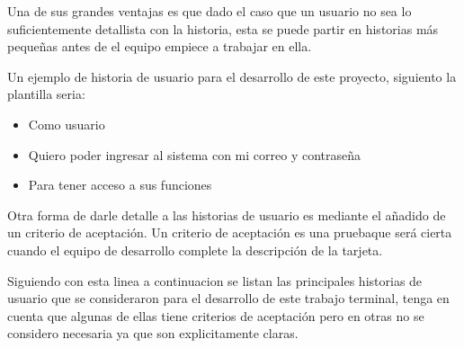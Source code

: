 Una de sus grandes ventajas es que dado el caso que un usuario no sea lo suficientemente detallista con la historia, esta se puede partir en historias más pequeñas antes de el equipo empiece a trabajar en ella.


Un ejemplo de historia de usuario para el desarrollo de este proyecto, siguiento la plantilla seria:



\begin{itemize}
	\item Como usuario
	\item Quiero poder ingresar al sistema con mi correo y contraseña
	\item Para tener acceso a sus funciones
\end{itemize}

Otra forma de darle detalle a las historias de usuario es mediante el añadido de un criterio de aceptación. Un criterio de aceptación es una pruebaque será cierta cuando el equipo de desarrollo complete la descripción de la tarjeta.


Siguiendo con esta linea a continuacion se listan las principales historias de usuario que se consideraron para el desarrollo de este trabajo terminal, tenga en cuenta que algunas de ellas tiene criterios de aceptación pero en otras no se considero necesaria ya que son explicitamente claras.


